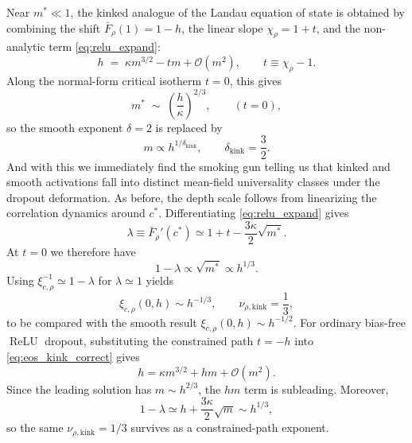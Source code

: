 \documentclass{article}
\DeclareMathOperator{\ReLU}{ReLU}
\newcommand{\relu}{\ensuremath{\ReLU}}
\theoremstyle{plain}
\theoremstyle{definition}
\theoremstyle{remark}
\begin{document}
Near \(m^*\ll 1\), the kinked analogue of the Landau equation of state is obtained by combining the shift \(\bar F_\rho(1)=1-h\), the linear slope \(\chi_\rho=1+t\), and the non-analytic term \eqref{eq:relu_expand}:
\relax
\begin{equation}
h \;=\; \kappa m^{3/2} - t m + \mathcal O(m^2), \qquad t\equiv \chi_\rho-1.
\label{eq:eos_kink_correct}
\end{equation}
\relax
Along the normal-form critical isotherm \(t=0\), this gives
\relax
\begin{equation}
m^* \;\sim\; \left(\frac{h}{\kappa}\right)^{2/3}, \qquad (t=0),
\label{eq:kink_mstar}
\end{equation}
\relax
so the smooth exponent \(\delta=2\) is replaced by
\relax
\begin{equation}
m \propto h^{1/\delta_{\mathrm{kink}}}, \qquad \delta_{\mathrm{kink}}=\frac{3}{2}.
\label{eq:kink_delta}
\end{equation}
\relax
And with this we immediately find the smoking gun telling us that kinked and smooth activations fall into distinct mean-field universality classes under the dropout deformation. As before, the depth scale follows from linearizing the correlation dynamics around \(c^*\). Differentiating \eqref{eq:relu_expand} gives
\relax
\begin{equation}
\lambda \equiv \bar F_\rho'(c^*) \simeq 1+t-\frac{3\kappa}{2}\sqrt{m^*}.
\label{eq:kink_slope}
\end{equation}
\relax
At \(t=0\) we therefore have
\relax
\begin{equation}
1-\lambda \propto \sqrt{m^*}\propto h^{1/3}.
\end{equation}
\relax
Using \(\xi_{c,\rho}^{-1}\simeq 1-\lambda\) for \(\lambda\simeq 1\) yields
\relax
\begin{equation}
\xi_{c,\rho}(0,h) \sim h^{-1/3}, \qquad \nu_{\rho,\mathrm{kink}}=\frac{1}{3},
\label{eq:kink_nu}
\end{equation}
\relax
to be compared with the smooth result \(\xi_{c,\rho}(0,h)\sim h^{-1/2}\).
For ordinary bias-free \relu{} dropout, substituting the constrained path \(t=-h\) into \eqref{eq:eos_kink_correct} gives
\relax
\begin{equation}
h=\kappa m^{3/2}+hm+\mathcal O(m^2).
\end{equation}
\relax
Since the leading solution has \(m\sim h^{2/3}\), the \(hm\) term is subleading. Moreover,
\relax
\begin{equation}
1-\lambda\simeq h+\frac{3\kappa}{2}\sqrt m\sim h^{1/3},
\end{equation}
\relax
so the same \(\nu_{\rho,\mathrm{kink}}=1/3\) survives as a constrained-path exponent.
\end{document}
